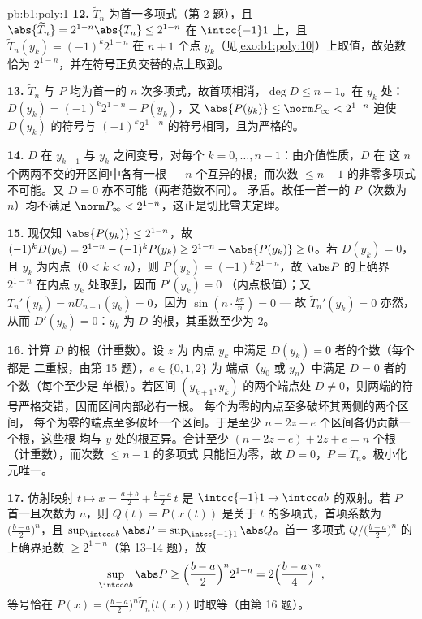 \begin{solution}{pb:b1:poly:1}
\textbf{12.} $\widetilde T_n$ 为首一多项式（第 2 题），且
$\abs{\widetilde T_n} = 2^{1-n}\abs{T_n} \leq 2^{1-n}$ 在
$\intcc{-1}1$ 上，且 $\widetilde T_n(y_k) = (-1)^k2^{1-n}$ 在
$n + 1$ 个点 $y_k$（见\cref{exo:b1:poly:10}）上取值，故范数恰为
$2^{1-n}$，并在符号正负交替的点上取到。

\textbf{13.} $\widetilde T_n$ 与 $P$ 均为首一的
$n$ 次多项式，故首项相消，$\deg D \leq n - 1$。在 $y_k$ 处：
$D(y_k) = (-1)^k2^{1-n} - P(y_k)$，又 $\abs{P(y_k)} \leq \norm
P_\infty < 2^{1-n}$ 迫使 $D(y_k)$ 的符号与
$(-1)^k2^{1-n}$ 的符号相同，且为严格的。

\textbf{14.} $D$ 在 $y_{k+1}$ 与 $y_k$ 之间变号，对每个
$k = 0, \dots, n-1$：由介值性质，$D$ 在
这 $n$ 个两两不交的开区间中各有一根 --- $n$
个互异的根，而次数 $\leq n - 1$ 的非零多项式
不可能。又 $D = 0$ 亦不可能（两者范数不同）。
矛盾。故任一首一的 $P$（次数为 $n$）均不满足 $\norm P_\infty <
2^{1-n}$，这正是切比雪夫定理。

\textbf{15.} 现仅知 $\abs{P(y_k)} \leq 2^{1-n}$，故 $(-1)^k
D(y_k) = 2^{1-n} - (-1)^kP(y_k) \geq 2^{1-n} - \abs{P(y_k)} \geq
0$。若 $D(y_k) = 0$，且 $y_k$ 为内点（$0 < k < n$），则
$P(y_k) = (-1)^k2^{1-n}$，故 $\abs P$ 的上确界
$2^{1-n}$ 在内点 $y_k$ 处取到，因而 $P'(y_k) = 0$
（内点极值）；又 $T_n'(y_k) = nU_{n-1}(y_k) = 0$，因为
$\sin(n\cdot\frac{k\pi}n) = 0$ --- 故 $\widetilde T_n'(y_k) = 0$
亦然，从而 $D'(y_k) = 0$：$y_k$ 为 $D$ 的根，其重数至少为
$2$。

\textbf{16.} 计算 $D$ 的根（计重数）。设 $z$ 为
内点 $y_k$ 中满足 $D(y_k) = 0$ 者的个数（每个都是
二重根，由第 15 题），$e \in \{0, 1, 2\}$ 为
端点（$y_0$ 或 $y_n$）中满足 $D = 0$ 者的个数（每个至少是
单根）。若区间 $(y_{k+1}, y_k)$ 的两个端点处 $D
\neq 0$，则两端的符号严格交错，因而区间内部必有一根。
每个为零的内点至多破坏其两侧的两个区间，
每个为零的端点至多破坏一个区间。于是至少
$n - 2z - e$ 个区间各仍贡献一个根，这些根
均与 $y$ 处的根互异。合计至少 $(n - 2z - e) + 2z + e = n$
个根（计重数），而次数 $\leq n - 1$ 的多项式
只能恒为零，故 $D = 0$，$P = \widetilde T_n$。极小化元唯一。

\textbf{17.} 仿射映射 $t \mapsto x = \frac{a+b}2 +
\frac{b-a}2\,t$ 是 $\intcc{-1}1 \to \intcc ab$ 的双射。若 $P$
首一且次数为 $n$，则 $Q(t) = P(x(t))$ 是关于
$t$ 的多项式，首项系数为 $\bigl(\frac{b-a}2\bigr)^n$，且
$\sup_{\intcc ab}\abs P = \sup_{\intcc{-1}1}\abs Q$。首一
多项式 $Q/\bigl(\frac{b-a}2\bigr)^n$ 的上确界范数 $\geq
2^{1-n}$（第 13--14 题），故
\[
\sup_{\intcc ab}\abs P \geq \Bigl(\frac{b-a}2\Bigr)^n 2^{1-n}
= 2\Bigl(\frac{b-a}4\Bigr)^n ,
\]
等号恰在 $P(x) = \bigl(\frac{b-a}2\bigr)^n
\widetilde T_n\bigl(t(x)\bigr)$ 时取等（由第 16 题）。


\end{solution}
